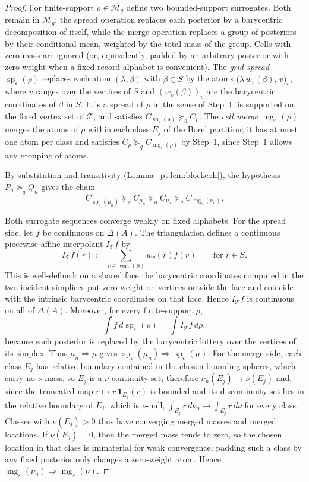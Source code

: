 \documentclass[11pt,a4paper]{article}
\theoremstyle{definition}
\newcommand{\1}{\mathbf 1}
\begin{document}
\begin{proof}
For finite-support $\rho\in\mathcal M_q$ define two bounded-support surrogates.  Both remain in
$\mathcal M_q$: the spread operation replaces each posterior by a barycentric decomposition of itself, while the merge
operation replaces a group of posteriors by their conditional mean, weighted by the total mass of the group.  Cells with
zero mass are ignored (or, equivalently, padded by an arbitrary posterior with zero weight when a fixed record alphabet is
convenient).
The \emph{grid spread} $\operatorname{sp}_\varepsilon(\rho)$ replaces each atom $(\lambda,\beta)$ with
$\beta\in\widetilde S$ by the atoms $\bigl(\lambda\,w_v(\beta),\,v\bigr)_{v}$, where $v$ ranges over the vertices of
$S$ and $(w_v(\beta))_v$ are the barycentric coordinates of $\beta$ in $S$.  It is a spread of $\rho$ in the sense of
Step~1, is supported on the fixed vertex set of $\mathcal T$, and satisfies
$C_{\operatorname{sp}_\varepsilon(\rho)}\succeq_q C_\rho$.
The \emph{cell merge} $\operatorname{mg}_\varepsilon(\rho)$ merges the atoms of $\rho$ within each class $E_j$ of the
Borel partition; it has at most one atom per class and satisfies
$C_\rho\succeq_q C_{\operatorname{mg}_\varepsilon(\rho)}$ by Step~1, since Step~1 allows any grouping of atoms.

By substitution and transitivity (Lemma~\ref{pt:lem:blockcoh}), the hypothesis $P_n\succeq_q Q_n$ gives the chain
\[
C_{\operatorname{sp}_\varepsilon(\mu_n)}
\succeq_q
C_{\mu_n}
\succeq_q
C_{\nu_n}
\succeq_q
C_{\operatorname{mg}_\varepsilon(\nu_n)}.
\]

Both surrogate sequences converge weakly on fixed alphabets.  For the spread side, let $f$ be continuous on
$\Delta(A)$.  The triangulation defines a continuous piecewise-affine interpolant $I_{\mathcal T}f$ by
\[
I_{\mathcal T}f(r):=\sum_{v\in\operatorname{vert}(S)}w_v(r)f(v)
\qquad\text{for }r\in S.
\]
This is well-defined: on a shared face the barycentric coordinates computed in the two incident simplices put zero
weight on vertices outside the face and coincide with the intrinsic barycentric coordinates on that face.  Hence
$I_{\mathcal T}f$ is continuous on all of $\Delta(A)$.  Moreover, for every finite-support $\rho$,
\[
\int f\,d\operatorname{sp}_\varepsilon(\rho)
= \int I_{\mathcal T}f\,d\rho,
\]
because each posterior is replaced by the barycentric lottery over the vertices of its simplex.  Thus
$\mu_n\Rightarrow\mu$ gives
$\operatorname{sp}_\varepsilon(\mu_n)\Rightarrow\operatorname{sp}_\varepsilon(\mu)$.  For the merge side, each class
$E_j$ has relative boundary contained in the chosen bounding spheres, which carry no $\nu$-mass, so $E_j$ is a
$\nu$-continuity set; therefore
$\nu_n(E_j)\to\nu(E_j)$ and, since the truncated map $r\mapsto r\,\1_{E_j}(r)$ is bounded and its discontinuity set
lies in the relative boundary of $E_j$, which is $\nu$-null,
$\int_{E_j}r\,d\nu_n\to\int_{E_j}r\,d\nu$ for every
class.  Classes with $\nu(E_j)>0$ thus have converging merged masses and merged locations.  If $\nu(E_j)=0$, then the
merged mass tends to zero, so the chosen location in that class is immaterial for weak convergence; padding such a class
by any fixed posterior only changes a zero-weight atom.  Hence
$\operatorname{mg}_\varepsilon(\nu_n)\Rightarrow\operatorname{mg}_\varepsilon(\nu)$.


\end{proof}
\end{document}
